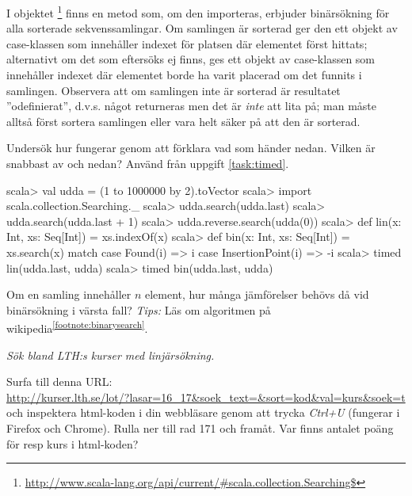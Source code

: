 I objektet \footnote{\href{http://www.scala-lang.org/api/current/\#scala.collection.Searching\$}{http://www.scala-lang.org/api/current/\#scala.collection.Searching\$}} finns en metod  som, om den importeras, erbjuder binärsökning för alla sorterade sekvenssamlingar. Om samlingen är sorterad ger den ett objekt av case-klassen  som innehåller indexet för platsen där elementet först hittats; alternativt om det som eftersöks ej finns, ges ett objekt av case-klassen  som innehåller indexet där elementet borde ha varit placerad om det funnits i samlingen. Observera att om samlingen inte är sorterad är resultatet ''odefinierat'', d.v.s. något returneras men det är \emph{inte} att lita på; man måste alltså först sortera samlingen eller vara helt säker på att den är sorterad. 

Undersök hur  fungerar genom att förklara vad som händer nedan. Vilken är snabbast av  och  nedan? Använd  från uppgift \ref{task:timed}.

\begin{REPL}
scala> val udda = (1 to 1000000 by 2).toVector
scala> import scala.collection.Searching._
scala> udda.search(udda.last)
scala> udda.search(udda.last + 1)
scala> udda.reverse.search(udda(0))  
scala> def lin(x: Int, xs: Seq[Int]) = xs.indexOf(x)
scala> def bin(x: Int, xs: Seq[Int]) = xs.search(x) match {
         case Found(i) => i
         case InsertionPoint(i) => -i
       }
scala> timed{ lin(udda.last, udda) }
scala> timed{ bin(udda.last, udda) }
\end{REPL}

\Subtask\Pen Om en samling innehåller $n$ element, hur många jämförelser behövs då vid binärsökning i värsta fall? \emph{Tips:} Läs om algoritmen på wikipedia\textsuperscript{\ref{footnote:binarysearch}}.





\Task \label{task:linsearch-lth}\emph{Sök bland LTH:s kurser med linjärsökning.} 

\Subtask Surfa till denna URL:\\ {\nolinebreak[4]\footnotesize\url{http://kurser.lth.se/lot/?lasar=16_17&soek_text=&sort=kod&val=kurs&soek=t}}
\\
och inspektera html-koden i din webbläsare genom att trycka \emph{Ctrl+U} (fungerar i Firefox och Chrome). Rulla ner till rad 171 och framåt. Var finns antalet poäng för resp kurs i html-koden?

